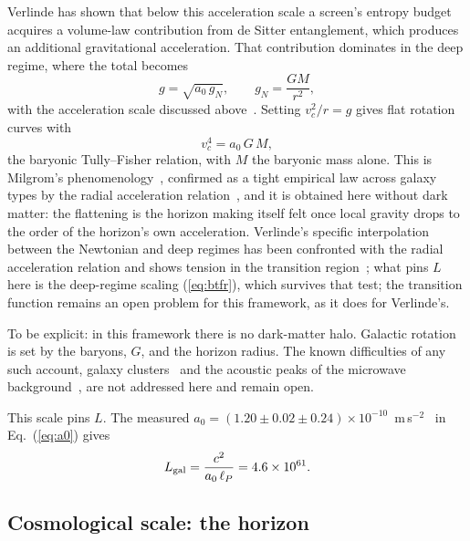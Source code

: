 \documentclass[aps,prd,twocolumn,superscriptaddress,nofootinbib,showkeys]{revtex4-2}
\begin{document}
Verlinde has shown that below this acceleration scale a screen's entropy budget acquires a volume-law contribution from de Sitter entanglement, which produces an additional gravitational acceleration. That contribution dominates in the deep regime, where the total becomes
\begin{equation}
g = \sqrt{a_0\,g_N},\qquad g_N = \frac{GM}{r^2},
\label{eq:deepmond}
\end{equation}
with the acceleration scale discussed above~\cite{verlinde2017}. Setting $v_c^2/r = g$ gives flat rotation curves with
\begin{equation}
v_c^4 = a_0\,G\,M ,
\label{eq:btfr}
\end{equation}
the baryonic Tully--Fisher relation, with $M$ the baryonic mass alone. This is Milgrom's phenomenology~\cite{milgrom1983}, confirmed as a tight empirical law across galaxy types by the radial acceleration relation~\cite{mcgaugh2016}, and it is obtained here without dark matter: the flattening is the horizon making itself felt once local gravity drops to the order of the horizon's own acceleration. Verlinde's specific interpolation between the Newtonian and deep regimes has been confronted with the radial acceleration relation and shows tension in the transition region~\cite{lelli2017}; what pins $L$ here is the deep-regime scaling (\ref{eq:btfr}), which survives that test; the transition function remains an open problem for this framework, as it does for Verlinde's.

To be explicit: in this framework there is no dark-matter halo. Galactic rotation is set by the baryons, $G$, and the horizon radius. The known difficulties of any such account, galaxy clusters~\cite{clowe2006} and the acoustic peaks of the microwave background~\cite{planck2018}, are not addressed here and remain open.

This scale pins $L$. The measured $a_0 = (1.20\pm0.02\pm0.24)\times10^{-10}$~m\,s$^{-2}$~\cite{mcgaugh2016} in Eq.~(\ref{eq:a0}) gives
\begin{equation}
L_{\rm gal} = \frac{c^2}{a_0\,\ell_P} = 4.6\times10^{61}.
\label{eq:Lgal}
\end{equation}

\subsection{Cosmological scale: the horizon}
\end{document}
